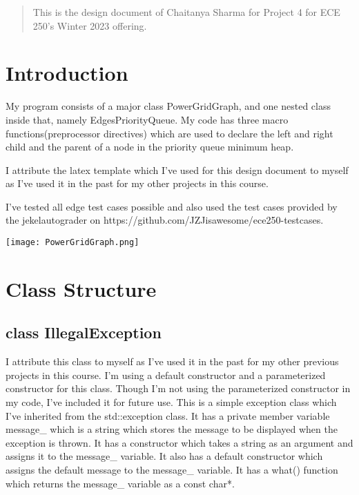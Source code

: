 \begin{center}
	\begin{abstract}
		This is the design document of Chaitanya Sharma for Project 4 for ECE 250's Winter 2023 offering.
	\end{abstract}
\end{center}


\section{Introduction}
	My program consists of a major class {\color{draculapurple}PowerGridGraph}, and one nested class inside that, namely {\color{draculapurple}EdgesPriorityQueue}.
	My code has three macro functions(preprocessor directives) which are used to declare the left and right child and the parent of a node in the priority queue minimum heap.

	I attribute the latex template which I've used for this design document to myself as I've used it in the past for my other projects in this course.

	I've tested all edge test cases possible and also used the test cases provided by the
	jekelautograder on {\color{DarkPastelBlue}https://github.com/JZJisawesome/ece250-testcases}.
\newline

\texttt{[image: PowerGridGraph.png]}

\section{Class Structure}
	\subsection{{\color{orange}class} {\Large{\color{draculapurple}IllegalException}}}

		I attribute this class to myself as I've used it in the past for my other previous projects in this course.
		I'm using a default constructor and a parameterized constructor for this class. Though I'm not using the 
		parameterized constructor in my code, I've included it for future use.
		This is a simple exception class which I've inherited from the {\color{draculapurple}std::exception} class. 
		It has a private member variable {\color{Turquoise}message\_} which is a string which stores the message to be 
		displayed when the exception is thrown. It has a constructor which takes a string as an argument and assigns it 
		to the {\color{Turquoise}message\_} variable. It also has a default constructor which assigns the default 
		message to the {\color{Turquoise}message\_} variable. It has a {\color{draculapurple}what()} function which returns 
		the {\color{Turquoise}message\_} variable as a {\color{draculapurple}const char*}.


